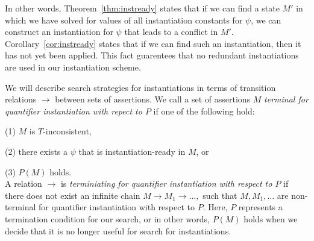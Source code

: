 \documentclass{llncs}
\begin{document}
In other words, Theorem~\ref{thm:instready} states that if we can find a state $M'$ in which we have solved for values of all instantiation constants for $\psi$, we can construct an instantiation for $\psi$ that leads to a conflict in $M'$.
Corollary~\ref{cor:instready} states that if we can find such an instantiation, then it has not yet been applied.
This fact guarentees that no redundant instantiations are used in our instantiation scheme.

\begin{comment}
Now, let us focus on identifying states in which there does not exist any useful instantiations with regards to assumptions about our counterexample.
The basic idea is to find a literal $\l \mapsto^I \psi$ in $M$ such that $\forall \bar{x}. \neg l[\bar{x}/\bar{e}]$ is satisifiable in $M$.
We call such a literal to be $\emph{compatible}$ in $M$.
For example, a EUF literal $f( t_1, \ldots, t_n ) = s$ is compatible if for all terms of the form $f( s_1, \ldots, s_n )$, we have that $t_1 \neq s_1, \ldots t_n \neq s_n$.
That is, the domain of $f( t_1, \ldots, t_n )$ is disjoint from all other terms with top symbol $f$.

Given a theory $T$, we will define search method that will drive the DPLL(T) search with splitting lemmas of the form $( l \vee \neg l )$.
The idea is to chose such lemmas such that the DPLL(T) search will either reach a state $M \parallel F$ such that $\psi$ is instantiation-ready in $M$, or there exists some literal $l \mapsto^I \psi$ that is compatible in $M$.
\end{comment}

We will describe search strategies for instantiations in terms of transition relations $\rightarrow$ between sets of assertions.
We call a set of assertions $M$ \emph{terminal for quantifier instantiation with repect to $P$} if one of the following hold:

(1) $M$ is $T$-inconsistent,

(2) there exists a $\psi$ that is instantiation-ready in $M$, or

(3) $P(M)$ holds. \\

A relation $\rightarrow$ is \emph{terminiating for quantifier instantiation with respect to $P$} if there does not exist an infinite chain $M \rightarrow M_1 \rightarrow \ldots,$ such that $M, M_1, \ldots$ are non-terminal for quantifier instantiation with respect to $P$.
Here, $P$ represents a termination condition for our search, or in other words, $P(M)$ holds when we decide that it is no longer useful for search for instantiations.
\end{document}
